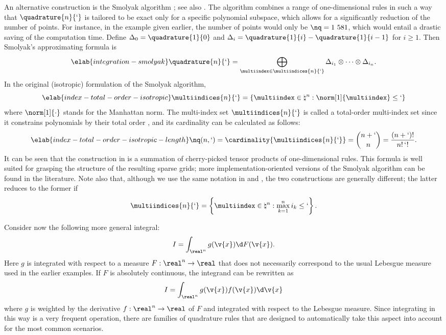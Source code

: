 An alternative construction is the Smolyak algorithm \cite{smolyak1963}; see
also \cite{eldred2008, heiss2008, maitre2010}. The algorithm combines a range of
one-dimensional rules in such a way that $\quadrature{n}{\lq}$ is tailored to be
exact only for a specific polynomial subspace, which allows for a significantly
reduction of the number of points. For instance, in the example given earlier,
the number of points would only be $\nq = 1~581$, which would entail a drastic
saving of the computation time. Define $\Delta_0 = \quadrature{1}{0}$ and
$\Delta_i = \quadrature{1}{i} - \quadrature{1}{i - 1}$ for $i \geq 1$. Then
Smolyak's approximating formula is
\begin{equation} \elab{integration-smolyak}
  \quadrature{n}{\lq} = \bigoplus_{\multiindex \in \multiindices{n}{\lq}} \Delta_{i_1} \otimes \cdots \otimes \Delta_{i_n}.
\end{equation}
In the original (isotropic) formulation of the Smolyak algorithm,
\begin{equation} \elab{index-total-order-isotropic}
  \multiindices{n}{\lq} = \left\{ \multiindex \in \natural^n: \norm[1]{\multiindex} \leq \lq \right\}
\end{equation}
where $\norm[1]{\cdot}$ stands for the Manhattan norm. The multi-index set
$\multiindices{n}{\lq}$ is called a total-order multi-index set since it
constrains polynomials by their total order \cite{eldred2008, beck2011}, and its
cardinality can be calculated as follows:
\begin{equation} \elab{index-total-order-isotropic-length}
  \nq(n, \lq) = \cardinality{\multiindices{n}{\lq}} = {n + \lq \choose n} = \frac{(n + \lq)!}{n! \, \lq!}.
\end{equation}
It can be seen that the construction in  is a
summation of cherry-picked tensor products of one-dimensional rules. This
formula is well suited for grasping the structure of the resulting sparse grids;
more implementation-oriented versions of the Smolyak algorithm can be found in
the literature. Note also that, although we use the same notation in
 and , the two constructions
are generally different; the latter reduces to the former if
\[
  \multiindices{n}{\lq} = \left\{ \multiindex \in \natural^n: \max_{k = 1}^n i_k \leq \lq \right\}.
\]

Consider now the following more general integral:
\[
  I = \int_{\real^n} g(\v{x}) \d F(\v{x}).
\]
Here $g$ is integrated with respect to a measure $F: \real^n \to \real$
\cite{durrett2010} that does not necessarily correspond to the usual Lebesgue
measure used in the earlier examples. If $F$ is absolutely continuous, the
integrand can be rewritten as
\[
  I = \int_{\real^n} g(\v{x}) f(\v{x}) \d \v{x}
\]
where $g$ is weighted by the derivative $f: \real^n \to \real$ of $F$ and
integrated with respect to the Lebesgue measure. Since integrating in this way
is a very frequent operation, there are families of quadrature rules that are
designed to automatically take this aspect into account for the most common
scenarios.


